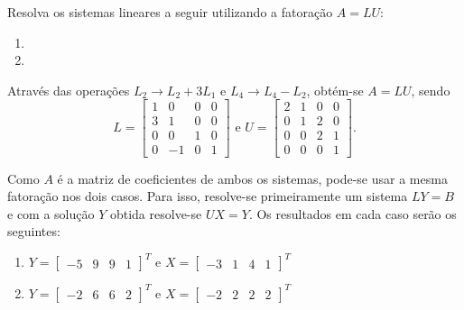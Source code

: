 \documentclass[12pt,a4paper]{article}
\begin{document}
\begin{ExerciseList}
\Exercise[title={2,5}]
Resolva os sistemas lineares a seguir utilizando a fatoração $A = LU$:
\begin{multicols}{2}
\begin{enumerate}
\item {}
\item {}
\end{enumerate}
\end{multicols}
\Answer
Através das operações $L_2 \to L_2 + 3L_1$ e $L_4 \to L_4 - L_2$, obtém-se $A = LU$, sendo
\[
L = \begin{bmatrix}
1 &  0 & 0 & 0\\
3 &  1 & 0 & 0\\
0 &  0 & 1 & 0\\
0 & -1 & 0 & 1
\end{bmatrix}
\text{ e }
U = \begin{bmatrix}
2 & 1 & 0 &  0\\
0 & 1 & 2 &  0\\
0 & 0 & 2 &  1\\
0 & 0 & 0 &  1
\end{bmatrix}.
\]

Como $A$ é a matriz de coeficientes de ambos os sistemas, pode-se usar a mesma fatoração nos dois casos. Para isso, resolve-se primeiramente um sistema $LY=B$ e com a solução $Y$ obtida resolve-se $UX = Y$. Os resultados em cada caso serão os seguintes:

\begin{enumerate}
\item
$
Y = \begin{bmatrix}
-5 & 9 & 9 & 1
\end{bmatrix}^T
\text{ e }
X = \begin{bmatrix}
-3 & 1 & 4 & 1
\end{bmatrix}^T
$
\item
$
Y  =
\begin{bmatrix}
-2 & 6 & 6 & 2
\end{bmatrix}^T
\text{ e }
 X  =
\begin{bmatrix}
-2 & 2 & 2 & 2
\end{bmatrix}^T$
\end{enumerate}


\end{ExerciseList}
\end{document}
